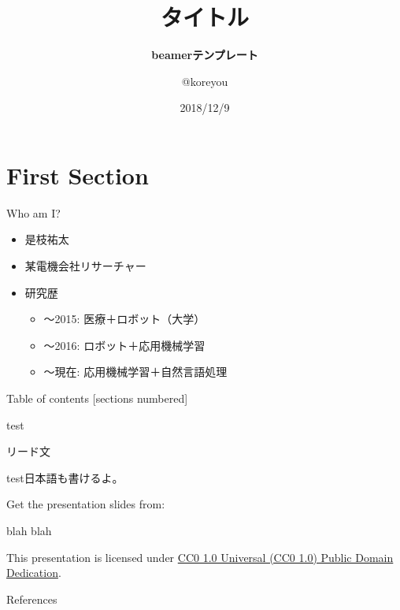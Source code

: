 

\title{\bfseries タイトル}
\subtitle{\bfseries beamerテンプレート}
\author{@koreyou}
\date[]{2018/12/9}




\frame{\titlepage}

\section{First Section}
\frame[standout]{\insertsection}

\begin{frame}{Who am I?}
  \begin{itemize}
    \item 是枝祐太
    \item 某電機会社リサーチャー
    \item 研究歴
    \begin{itemize}
        \item 〜2015: 医療＋ロボット（大学）
        \item 〜2016: ロボット＋応用機械学習
        \item 〜現在: 応用機械学習＋自然言語処理
    \end{itemize}
  \end{itemize}
\end{frame}

\begin{frame}{Table of contents}
  [sections numbered]
  \tableofcontents[hideallsubsections]
\end{frame}

\begin{frame}{test}
  \begin{lead}
    リード文
  \end{lead}
  test\cite{knuth}日本語も書けるよ。
\end{frame}

\begin{frame}[c]

  Get the presentation slides from:

  \begin{center}blah blah\end{center}

  This presentation is licensed under
    \href{https://creativecommons.org/publicdomain/zero/1.0/}{
    CC0 1.0 Universal (CC0 1.0) Public Domain Dedication}.

  \begin{center}\cczero\end{center}

\end{frame}

\begin{frame}[allowframebreaks]{References}
  \printbibliography[heading=none]
\end{frame}



